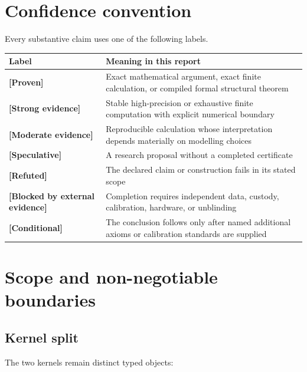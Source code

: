 \documentclass[11pt,a4paper,openany]{report}
\newcommand{\statusProven}{\textcolor{fingreen}{[Proven]}}
\newcommand{\statusStrong}{\textcolor{finblue}{[Strong evidence]}}
\newcommand{\statusModerate}{\textcolor{finviolet}{[Moderate evidence]}}
\newcommand{\statusSpeculative}{\textcolor{finorange}{[Speculative]}}
\newcommand{\statusRefuted}{\textcolor{finred}{[Refuted]}}
\begin{document}
\tableofcontents
\clearpage
{}

\chapter*{Confidence convention}

Every substantive claim uses one of the following labels.

\begin{center}
\begingroup\small
\setlength{\tabcolsep}{2.5pt}
\renewcommand{\arraystretch}{1.16}
\begin{longtable}{@{}p{}p{}@{}}
\toprule
\textbf{Label} & \textbf{Meaning in this report} \\
\midrule
\endhead
\textbf{\statusProven{}} & Exact mathematical argument, exact finite calculation, or compiled formal structural theorem \\
\textbf{\statusStrong{}} & Stable high-precision or exhaustive finite computation with explicit numerical boundary \\
\textbf{\statusModerate{}} & Reproducible calculation whose interpretation depends materially on modelling choices \\
\textbf{\statusSpeculative{}} & A research proposal without a completed certificate \\
\textbf{\statusRefuted{}} & The declared claim or construction fails in its stated scope \\
\textbf{[Blocked by external evidence]} & Completion requires independent data, custody, calibration, hardware, or unblinding \\
\textbf{[Conditional]} & The conclusion follows only after named additional axioms or calibration standards are supplied \\
\bottomrule
\end{longtable}
\endgroup
\end{center}

\chapter{Scope and non-negotiable boundaries}

\section{Kernel split}

The two kernels remain distinct typed objects:
\end{document}
